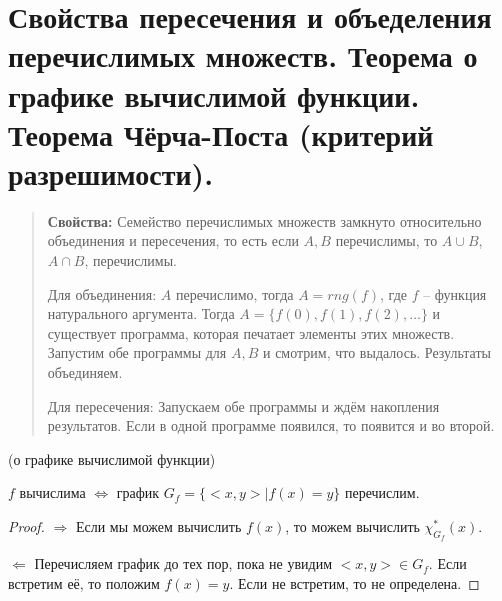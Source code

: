 \section{Свойства пересечения и объеделения перечислимых множеств. Теорема о графике вычислимой функции. Теорема
Чёрча-Поста (критерий разрешимости).}
\begin{quote}{\textbf{Свойства: }}
Семейство перечислимых множеств замкнуто относительно объединения и пересечения, то есть если $A, B$ перечислимы,
	то $A \cup B$, $A \cap B$, перечислимы.
\par Для объединения: $A$ перечислимо, тогда $A=rng(f)$, где $f$ -- функция натурального аргумента. Тогда $A = \{
	f(0), f(1), f(2), \dots \}$ и существует программа, которая печатает элементы этих множеств. Запустим обе
программы для $A, B$ и смотрим, что выдалось. Результаты объединяем.
\par Для пересечения: Запускаем обе программы и ждём накопления результатов. Если в одной программе появился, то
	появится и во второй.
\end{quote}
\begin{theorem}{(о графике вычислимой функции)}
\par$f$ вычислима $\iff$ график $G_{f} = \{<x,y> | f(x) = y\}$ перечислим.
\begin{proof}
\par $\Longrightarrow$ Если мы можем вычислить $f(x)$, то можем вычислить $\chi^*_{G_f}(x)$.
\par $\Longleftarrow$ Перечисляем график до тех пор, пока не увидим $<x,y> \in G_{f}$. Если встретим её, то положим
	$f(x) = y$. Если не встретим, то не определена.
\end{proof}
\end{theorem}
